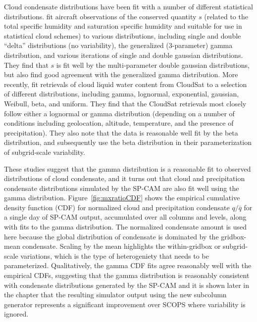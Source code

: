 Cloud condensate distributions have been fit with a number of different
statistical distributions. \citet{larson_et_al_2001} fit aircraft
observations of the conserved quantity \(s\) (related to the total
specific humidity and saturation specific humidity and suitable for use
in statistical cloud schemes) to various distributions, including single
and double ``delta'' distributions (no variability), the generalized
(3-parameter) gamma distribution, and various iterations of single and
double gaussian distributions. They find that \(s\) is fit well by the
multi-parameter double gaussian distributions, but also find good
agreement with the generalized gamma distribution. More recently,
\citet{lee_et_al_2010} fit retrievals of cloud liquid water content from
CloudSat to a selection of different distributions, including gamma,
lognormal, exponential, gaussian, Weibull, beta, and uniform. They find
that the CloudSat retrievals most closely follow either a lognormal or
gamma distribution (depending on a number of conditions including
geolocation, altitude, temperature, and the presence of precipitation).
They also note that the data is reasonable well fit by the beta
distribution, and \citet{oreopoulos_et_al_2012} subsequently use the
beta distribution in their parameterization of subgrid-scale
variability.

These studies suggest that the gamma distribution is a reasonable fit to
observed distributions of cloud condensate, and it turns out that cloud
and precipitation condensate distributions simulated by the SP-CAM are
also fit well using the gamma distribution. Figure~\ref{fig:mxratioCDF}
shows the empirical cumulative density function (CDF) for normalized
cloud and precipitation condensate \(q / \overline{q}\) for a single day
of SP-CAM output, accumulated over all columns and levels, along with
fits to the gamma distribution. The normalized condensate amount is used
here because the global distribution of condensate is dominated by the
gridbox-mean condensate. Scaling by the mean highlights the
within-gridbox or subgrid-scale variations, which is the type of
heterogeniety that needs to be parameterized. Qualitatively, the gamma
CDF fits agree reasonably well with the empirical CDFs, suggesting that
the gamma distribution is reasonably consistent with condensate
distributions generated by the SP-CAM and it is shown later in the
chapter that the resulting simulator output using the new subcolumn
generator represents a significant improvement over SCOPS where
variability is ignored.

